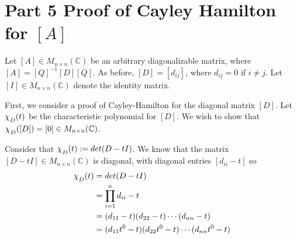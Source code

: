 \documentclass[12pt, letterpaper]{article}
\newcommand{\C}{\mathbb{C}}
\begin{document}
\section*{Part 5 \textmd{Proof of Cayley Hamilton for $[A]$}}

Let $[A] \in M_{n \times n}(\C)$ be an arbitrary diagonalizable matrix, where $[A] = [Q]^{-1}[D][Q]$. As before, $[D] = [d_{ij}]$, where $d_{ij} = 0$ if $i \ne j$. Let $[I] \in M_{n \times n}(\C)$ denote the identity matrix.

First, we consider a proof of Cayley-Hamilton for the diagonal matrix $[D]$. Let $\chi_{\raisebox{-.5ex}{$\scriptstyle D$}}(t)$ be the characteristic polynomial for $[D]$. We wish to show that $\chi_{\raisebox{-.5ex}{$\scriptstyle D$}}([D]) = [0] \in M_{n \times n}(\C)$.

Consider that $\chi_{\raisebox{-.5ex}{$\scriptstyle D$}}(t) := det(D-tI)$. We know that the matrix $[D-tI] \in M_{n \times n}(\C)$ is diagonal, with diagonal entries $[d_{ii} - t]$ so 
\begin{align*}
\chi_{\raisebox{-.5ex}{$\scriptstyle D$}}(t) 
	&= det(D-tI) \\ 
	&= \prod_{i=1}^{n}d_{ii}-t \\
	&= (d_{11} - t)(d_{22} - t) \cdots (d_{nn} - t) \\
	&= (d_{11}t^0 - t)(d_{22}t^0 - t) \cdots (d_{nn}t^0 - t)	
\end{align*}
\end{document}
